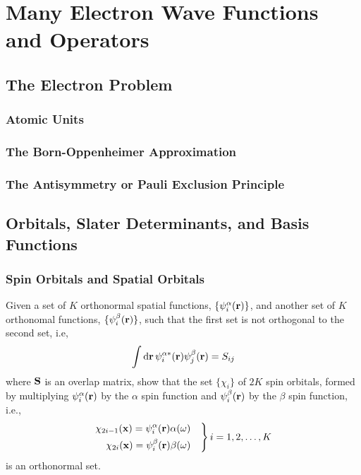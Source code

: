 \documentclass[a4paper]{book}
\newcommand*{\dif}{\mathop{}\!\mathrm{d}}
\newcommand{\bfr}{{\bf r}}
\newcommand{\bfx}{{\bf x}}
\begin{document}

	\chapter{Many Electron Wave Functions and Operators}
	
	\section{The Electron Problem}
	
	\subsection{Atomic Units}
	
	\subsection{The Born-Oppenheimer Approximation}
	
	\subsection{The Antisymmetry or Pauli Exclusion Principle}
	
	\section{Orbitals, Slater Determinants, and Basis Functions}
	
	\subsection{Spin Orbitals and Spatial Orbitals}
	
	\begin{exercise}
	Given a set of $K$ orthonormal spatial functions, $\{\psi^\alpha_i(\bfr)\}$, and another set of $K$ orthonomal functions, $\{\psi^\beta_i(\bfr)\}$, such that the first set is not orthogonal to the second set, i.e, 
	\[
		\int \dif \bfr \, \psi^{\alpha*}_i( \bfr ) \psi^\beta_j( \bfr ) = S_{ij}
	\]
	where ${\bf S}$ is an overlap matrix, show that the set $\{ \chi_i \}$ of $2K$ spin orbitals, formed by multiplying $\psi^\alpha_i( \bfr )$ by the $\alpha$ spin function and $\psi^\beta_i( \bfr )$ by the $\beta$ spin function, i.e.,
	\[ \left.
	\begin{rgathered}
		\chi_{2i-1}(\bfx) = \psi^\alpha_i( \bfr ) \alpha( \omega ) \quad \\
		\chi_{2i}(\bfx) = \psi^\beta_i( \bfr ) \beta( \omega ) \quad
	\end{rgathered} \right\} i = 1, 2, \ldots, K
	\]
	is an orthonormal set.
	\end{exercise}
	
\end{document}
